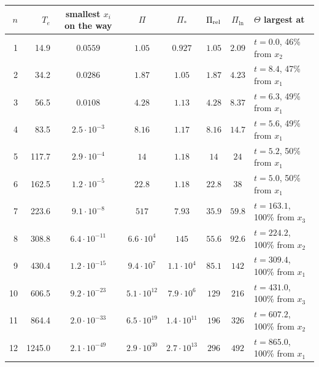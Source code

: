 \begin{tabular}{rrcccccl}
\toprule
$n$ & $T_e$ & smallest $x_i$ on the way & $\Pi$ & $\Pi_*$ & $\Pi_{\rm rel}$ & $\Pi_{\ln}$ & $\Theta$ largest at\\
\midrule
1 & 14.9 & $0.0559$ & $1.05$ & $0.927$ & $1.05$ & $2.09$ & $t=0.0$, 46\% from $x_2$\\
2 & 34.2 & $0.0286$ & $1.87$ & $1.05$ & $1.87$ & $4.23$ & $t=8.4$, 47\% from $x_1$\\
3 & 56.5 & $0.0108$ & $4.28$ & $1.13$ & $4.28$ & $8.37$ & $t=6.3$, 49\% from $x_1$\\
4 & 83.5 & $2.5\cdot10^{-3}$ & $8.16$ & $1.17$ & $8.16$ & $14.7$ & $t=5.6$, 49\% from $x_1$\\
5 & 117.7 & $2.9\cdot10^{-4}$ & $14$ & $1.18$ & $14$ & $24$ & $t=5.2$, 50\% from $x_1$\\
6 & 162.5 & $1.2\cdot10^{-5}$ & $22.8$ & $1.18$ & $22.8$ & $38$ & $t=5.0$, 50\% from $x_1$\\
7 & 223.6 & $9.1\cdot10^{-8}$ & $517$ & $7.93$ & $35.9$ & $59.8$ & $t=163.1$, 100\% from $x_3$\\
8 & 308.8 & $6.4\cdot10^{-11}$ & $6.6\cdot10^{4}$ & $145$ & $55.6$ & $92.6$ & $t=224.2$, 100\% from $x_2$\\
9 & 430.4 & $1.2\cdot10^{-15}$ & $9.4\cdot10^{7}$ & $1.1\cdot10^{4}$ & $85.1$ & $142$ & $t=309.4$, 100\% from $x_1$\\
10 & 606.5 & $9.2\cdot10^{-23}$ & $5.1\cdot10^{12}$ & $7.9\cdot10^{6}$ & $129$ & $216$ & $t=431.0$, 100\% from $x_3$\\
11 & 864.4 & $2.0\cdot10^{-33}$ & $6.5\cdot10^{19}$ & $1.4\cdot10^{11}$ & $196$ & $326$ & $t=607.2$, 100\% from $x_2$\\
12 & 1245.0 & $2.1\cdot10^{-49}$ & $2.9\cdot10^{30}$ & $2.7\cdot10^{13}$ & $296$ & $492$ & $t=865.0$, 100\% from $x_1$\\
\bottomrule
\end{tabular}
